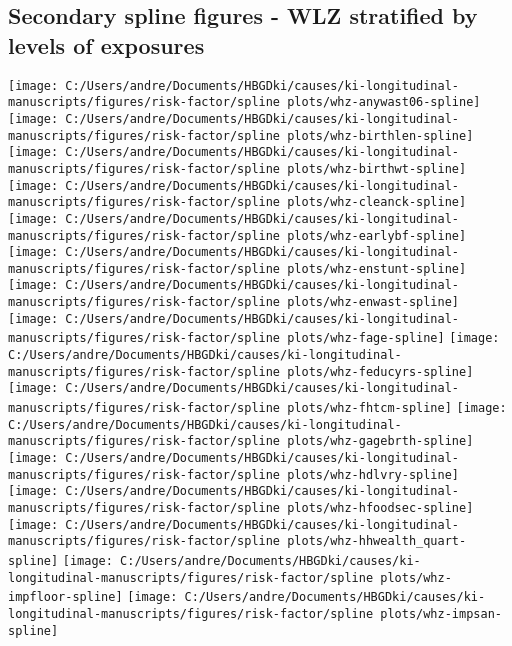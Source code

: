 \documentclass[9pt,]{book}
\begin{document}
\subsection{Secondary spline figures - WLZ stratified by levels of
exposures}\label{secondary-spline-figures---wlz-stratified-by-levels-of-exposures}

\texttt{[image: C:/Users/andre/Documents/HBGDki/causes/ki-longitudinal-manuscripts/figures/risk-factor/spline plots/whz-anywast06-spline]}
\texttt{[image: C:/Users/andre/Documents/HBGDki/causes/ki-longitudinal-manuscripts/figures/risk-factor/spline plots/whz-birthlen-spline]}
\texttt{[image: C:/Users/andre/Documents/HBGDki/causes/ki-longitudinal-manuscripts/figures/risk-factor/spline plots/whz-birthwt-spline]}
\texttt{[image: C:/Users/andre/Documents/HBGDki/causes/ki-longitudinal-manuscripts/figures/risk-factor/spline plots/whz-cleanck-spline]}
\texttt{[image: C:/Users/andre/Documents/HBGDki/causes/ki-longitudinal-manuscripts/figures/risk-factor/spline plots/whz-earlybf-spline]}
\texttt{[image: C:/Users/andre/Documents/HBGDki/causes/ki-longitudinal-manuscripts/figures/risk-factor/spline plots/whz-enstunt-spline]}
\texttt{[image: C:/Users/andre/Documents/HBGDki/causes/ki-longitudinal-manuscripts/figures/risk-factor/spline plots/whz-enwast-spline]}
\texttt{[image: C:/Users/andre/Documents/HBGDki/causes/ki-longitudinal-manuscripts/figures/risk-factor/spline plots/whz-fage-spline]}
\texttt{[image: C:/Users/andre/Documents/HBGDki/causes/ki-longitudinal-manuscripts/figures/risk-factor/spline plots/whz-feducyrs-spline]}
\texttt{[image: C:/Users/andre/Documents/HBGDki/causes/ki-longitudinal-manuscripts/figures/risk-factor/spline plots/whz-fhtcm-spline]}
\texttt{[image: C:/Users/andre/Documents/HBGDki/causes/ki-longitudinal-manuscripts/figures/risk-factor/spline plots/whz-gagebrth-spline]}
\texttt{[image: C:/Users/andre/Documents/HBGDki/causes/ki-longitudinal-manuscripts/figures/risk-factor/spline plots/whz-hdlvry-spline]}
\texttt{[image: C:/Users/andre/Documents/HBGDki/causes/ki-longitudinal-manuscripts/figures/risk-factor/spline plots/whz-hfoodsec-spline]}
\texttt{[image: C:/Users/andre/Documents/HBGDki/causes/ki-longitudinal-manuscripts/figures/risk-factor/spline plots/whz-hhwealth\_quart-spline]}
\texttt{[image: C:/Users/andre/Documents/HBGDki/causes/ki-longitudinal-manuscripts/figures/risk-factor/spline plots/whz-impfloor-spline]}
\texttt{[image: C:/Users/andre/Documents/HBGDki/causes/ki-longitudinal-manuscripts/figures/risk-factor/spline plots/whz-impsan-spline]}
\end{document}
